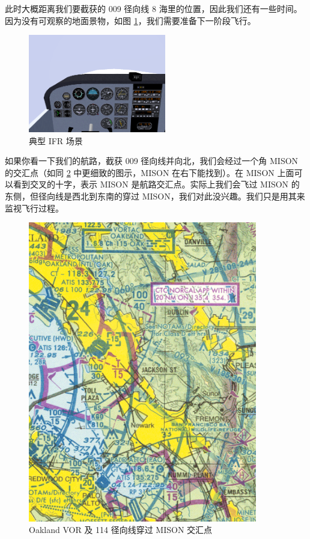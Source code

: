 此时大概距离我们要截获的 009 径向线 8 海里的位置，因此我们还有一些时间。因为没有可观察的地面景物，如图 \ref{fig:murk}，我们需要准备下一阶段飞行。

\begin{figure}
  \begin{center}
    \includegraphics[width=6cm]{img/murk}
    \caption{典型 IFR 场景}
    \label{fig:murk}
  \end{center}
\end{figure}

如果你看一下我们的航路，截获 009 径向线并向北，我们会经过一个角 MISON 的交汇点（如同 \ref{fig:Oakland} 中更细致的图示，MISON 在右下能找到）。在 MISON 上面可以看到交叉的十字，表示 MISON 是航路交汇点。实际上我们会飞过 MISON 的东侧，但径向线是西北到东南的穿过 MISON，我们对此没兴趣。我们只是用其来监视飞行过程。

\begin{figure}
  \begin{center}
    \includegraphics[width=10cm]{img/Oakland}
    \caption{Oakland VOR 及 114 径向线穿过 MISON 交汇点}
    \label{fig:Oakland}
  \end{center}
\end{figure}

